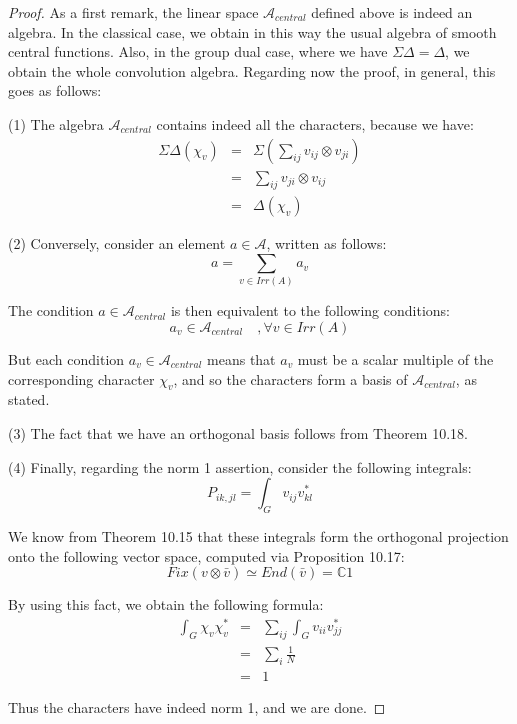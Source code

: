 \documentclass[12pt]{amsbook}
\begin{document}
\begin{proof}
As a first remark, the linear space $\mathcal A_{central}$ defined above is indeed an algebra. In the classical case, we obtain in this way the usual algebra of smooth central functions. Also, in the group dual case, where we have $\Sigma\Delta=\Delta$, we obtain the whole convolution algebra. Regarding now the proof, in general, this goes as follows:

\medskip

(1) The algebra $\mathcal A_{central}$ contains indeed all the characters, because we have:
\begin{eqnarray*}
\Sigma\Delta(\chi_v)
&=&\Sigma\left(\sum_{ij}v_{ij}\otimes v_{ji}\right)\\
&=&\sum_{ij}v_{ji}\otimes v_{ij}\\
&=&\Delta(\chi_v)
\end{eqnarray*}

(2) Conversely, consider an element $a\in\mathcal A$, written as follows:
$$a=\sum_{v\in Irr(A)}a_v$$

The condition $a\in\mathcal A_{central}$ is then equivalent to the following conditions:
$$a_v\in\mathcal A_{central}\quad,\forall v\in Irr(A)$$

But each condition $a_v\in\mathcal A_{central}$ means that $a_v$ must be a scalar multiple of the corresponding character $\chi_v$, and so the characters form a basis of $\mathcal A_{central}$, as stated.

\medskip

(3) The fact that we have an orthogonal basis follows from Theorem 10.18. 

\medskip

(4) Finally, regarding the norm 1 assertion, consider the following integrals:
$$P_{ik,jl}=\int_Gv_{ij}v_{kl}^*$$

We know from Theorem 10.15 that these integrals form the orthogonal projection onto the following vector space, computed via Proposition 10.17:
$$Fix(v\otimes\bar{v})
\simeq End(\bar{v})
=\mathbb C1$$

By using this fact, we obtain the following formula:
\begin{eqnarray*}
\int_G\chi_v\chi_v^*
&=&\sum_{ij}\int_Gv_{ii}v_{jj}^*\\
&=&\sum_i\frac{1}{N}\\
&=&1
\end{eqnarray*}

Thus the characters have indeed norm 1, and we are done.
\end{proof}
\end{document}
